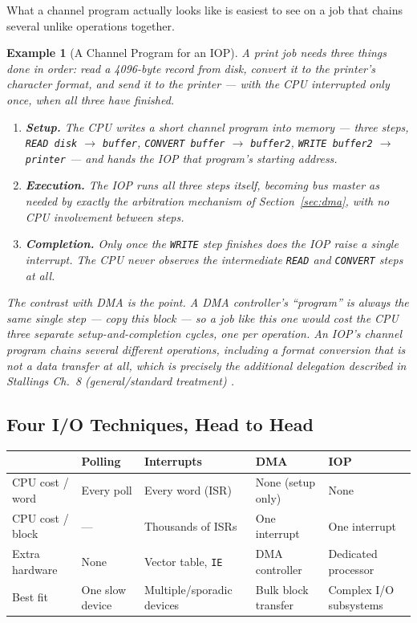\documentclass[11pt]{article}
\newtheorem{example}{Example}[section]
\begin{document}
What a channel program actually looks like is easiest to see on a job that chains several unlike operations together.

\begin{example}[A Channel Program for an IOP]
\label{ex:channel-program}
A print job needs three things done in order: read a 4096-byte record from disk, convert it to the printer's character format, and send it to the printer --- with the CPU interrupted only once, when all three have finished.
\begin{enumerate}
  \item \textbf{Setup.} The CPU writes a short channel program into memory --- three steps, \texttt{READ disk} $\to$ \texttt{buffer}, \texttt{CONVERT buffer} $\to$ \texttt{buffer2}, \texttt{WRITE buffer2} $\to$ \texttt{printer} --- and hands the IOP that program's starting address.
  \item \textbf{Execution.} The IOP runs all three steps itself, becoming bus master as needed by exactly the arbitration mechanism of Section~\ref{sec:dma}, with no CPU involvement between steps.
  \item \textbf{Completion.} Only once the \texttt{WRITE} step finishes does the IOP raise a single interrupt. The CPU never observes the intermediate \texttt{READ} and \texttt{CONVERT} steps at all.
\end{enumerate}
The contrast with DMA is the point. A DMA controller's ``program'' is always the same single step --- copy this block --- so a job like this one would cost the CPU three separate setup-and-completion cycles, one per operation. An IOP's channel program chains several \emph{different} operations, including a format conversion that is not a data transfer at all, which is precisely the additional delegation described in Stallings Ch.~8 (general/standard treatment) \cite{Stallings2015_computer_organization}.
\end{example}

\subsection{Four I/O Techniques, Head to Head}

\begin{center}
\tiny
\begin{tabular}{@{}lllll@{}}
\toprule
& \textbf{Polling} & \textbf{Interrupts} & \textbf{DMA} & \textbf{IOP} \\
\midrule
CPU cost / word & Every poll & Every word (ISR) & None (setup only) & None \\
CPU cost / block & --- & Thousands of ISRs & One interrupt & One interrupt \\
Extra hardware & None & Vector table, \texttt{IE} & DMA controller & Dedicated processor \\
Best fit & One slow device & Multiple/sporadic devices & Bulk block transfer & Complex I/O subsystems \\
\bottomrule
\end{tabular}
\end{center}
\end{document}
